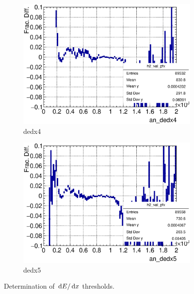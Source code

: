 \begin{figure}[t]
       \begin{subfigure}{\trfigwid\textwidth}
            \includegraphics[width=\textwidth]{figures/sel/ans_dedx4_vs_p_pr_res_hist2d_al2_selpr_con_slice.eps}
            \caption{dedx4}
            \label{subfig:dedx4}
       \end{subfigure}
       \begin{subfigure}{\trfigwid\textwidth}
            \includegraphics[width=\textwidth]{figures/sel/ans_dedx5_vs_p_pr_res_hist2d_al2_selpr_con_slice.eps}
            \caption{dedx5}
            \label{subfig:dedx5}
       \end{subfigure}
       \caption{Determination of $\,\textrm{d}E/\,\textrm{d}x$ thresholds.}
       \label{fig:esc-andedx-slice}
    \end{figure}

